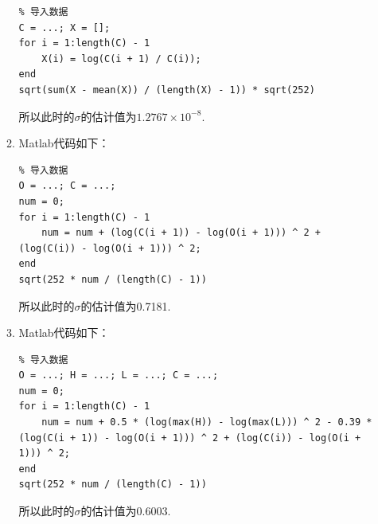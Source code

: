 \begin{enumerate}[label=\arabic{section}.\arabic*]
\begin{enumerate}
\begin{lstlisting}
% 导入数据
C = ...; X = [];
for i = 1:length(C) - 1
    X(i) = log(C(i + 1) / C(i));
end
sqrt(sum(X - mean(X)) / (length(X) - 1)) * sqrt(252)
        \end{lstlisting}
        所以此时的$\sigma$的估计值为$1.2767 \times 10^{-8}$.
        \item Matlab代码如下：
        \begin{lstlisting}
% 导入数据
O = ...; C = ...;
num = 0;
for i = 1:length(C) - 1
    num = num + (log(C(i + 1)) - log(O(i + 1))) ^ 2 + (log(C(i)) - log(O(i + 1))) ^ 2;
end
sqrt(252 * num / (length(C) - 1))
        \end{lstlisting}
        所以此时的$\sigma$的估计值为0.7181.
        \item Matlab代码如下：
        \begin{lstlisting}
% 导入数据
O = ...; H = ...; L = ...; C = ...;
num = 0;
for i = 1:length(C) - 1
    num = num + 0.5 * (log(max(H)) - log(max(L))) ^ 2 - 0.39 * (log(C(i + 1)) - log(O(i + 1))) ^ 2 + (log(C(i)) - log(O(i + 1))) ^ 2;
end
sqrt(252 * num / (length(C) - 1))
        \end{lstlisting}
        所以此时的$\sigma$的估计值为0.6003.
    \end{enumerate}
\end{enumerate}
\clearpage